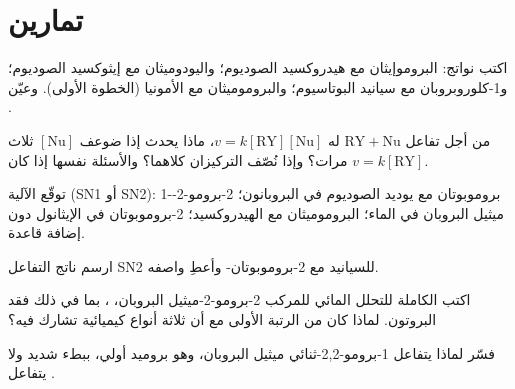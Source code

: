 \section{تمارين}

\begin{exercise}[$\star$]\label{exo:b1:nucleophilic-substitution:1}
اكتب نواتج: البروموإيثان مع هيدروكسيد الصوديوم؛ واليودوميثان مع
إيثوكسيد الصوديوم؛ و1-كلوروبروبان مع سيانيد البوتاسيوم؛ والبروموميثان مع
الأمونيا (الخطوة الأولى). وعيّن   .
\end{exercise}

\begin{exercise}[$\star$]\label{exo:b1:nucleophilic-substitution:2}
من أجل تفاعل $\mathrm{RY} + \mathrm{Nu}$ له $v = k[\mathrm{RY}][\mathrm{Nu}]$،
ماذا يحدث  إذا ضوعف $[\mathrm{Nu}]$ ثلاث مرات؟ وإذا نُصّف
التركيزان كلاهما؟ والأسئلة نفسها إذا كان $v = k[\mathrm{RY}]$.
\end{exercise}

\begin{exercise}[$\star$]\label{exo:b1:nucleophilic-substitution:3}
توقّع الآلية (SN1 أو SN2): 1-بروموبوتان مع يوديد الصوديوم في
البروبانون؛ 2-برومو-2-ميثيل البروبان في الماء؛ البروموميثان مع الهيدروكسيد؛
2-بروموبوتان في الإيثانول دون إضافة قاعدة.
\end{exercise}

\begin{exercise}[$\star$]\label{exo:b1:nucleophilic-substitution:4}
ارسم ناتج التفاعل SN2 للسيانيد مع 2-بروموبوتان-
 وأعطِ واصفه.
\end{exercise}

\begin{exercise}[$\star\star$]\label{exo:b1:nucleophilic-substitution:5}
اكتب  الكاملة للتحلل المائي للمركب 2-برومو-2-ميثيل البروبان،
، بما في ذلك فقد البروتون. لماذا كان 
من الرتبة الأولى مع أن ثلاثة أنواع كيميائية تشارك فيه؟
\end{exercise}

\begin{exercise}[$\star\star$]\label{exo:b1:nucleophilic-substitution:6}
فسّر لماذا يتفاعل 1-برومو-2,2-ثنائي ميثيل البروبان، وهو بروميد أولي، ببطء
شديد  ولا يتفاعل .
\end{exercise}

